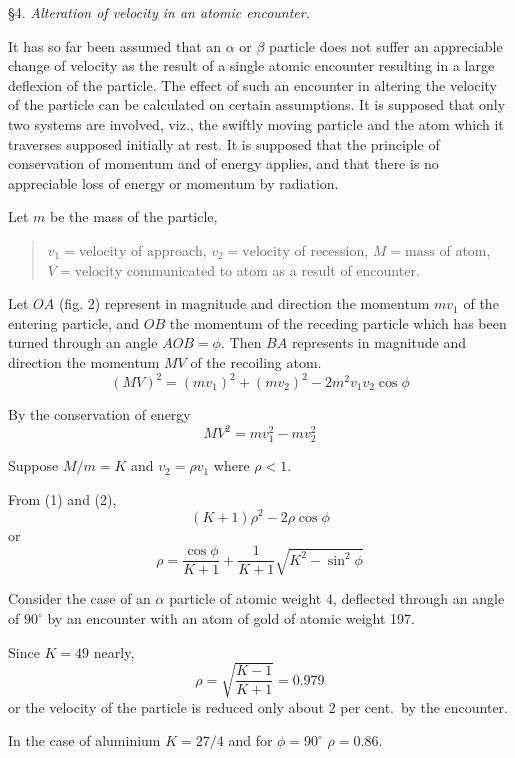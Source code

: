 \documentclass[12pt]{article}
\begin{document}
\bigskip
\S 4. {\it Alteration of velocity in an atomic encounter.}

\bigskip
It has so far been assumed that an $\alpha$ or $\beta$ particle does not suffer an appreciable change of velocity
as the result of a single atomic encounter resulting in a large deflexion of the particle.
The effect of such an encounter in altering the velocity of the particle can be calculated on certain assumptions.
It is supposed that only two systems are involved, viz., the swiftly moving particle and the atom which
it traverses supposed initially at rest.
It is supposed that the principle of conservation of momentum and of energy applies,
and that there is no appreciable loss of energy or momentum by radiation.

\bigskip
Let $m$ be the mass of the particle,
\begin{quote}
$v_1=\text{velocity}$ of approach,\newline
$v_2=\text{velocity}$ of recession,\newline
$M=\text{mass}$ of atom,\newline
$V=\text{velocity}$ communicated to atom as a result of encounter.
\end{quote}

Let $OA$ (fig. 2) represent in magnitude and direction the momentum $mv_1$ of the entering particle,
and $OB$ the momentum of the receding particle which has been turned through an angle $AOB=\phi$.
Then $BA$ represents in magnitude and direction the momentum $MV$ of the recoiling atom.
\begin{equation*}
(MV)^2=(mv_1)^2+(mv_2)^2-2m^2v_1v_2\cos\phi
\tag{1}
\end{equation*}

By the conservation of energy
\begin{equation*}
MV^2=mv_1^2-mv_2^2
\tag{2}
\end{equation*}

Suppose $M/m=K$ and $v_2=\rho v_1$ where $\rho<1$.

\bigskip
From (1) and (2),
\begin{equation*}
(K+1)\rho^2-2\rho\cos\phi
\end{equation*}
or
\begin{equation*}
\rho=\frac{\cos\phi}{K+1}+\frac{1}{K+1}\sqrt{K^2-\sin^2\phi}
\end{equation*}

Consider the case of an $\alpha$ particle of atomic weight 4,
deflected through an angle of $90^\circ$ by an encounter with an atom of gold of atomic weight 197.

\bigskip
Since $K=49$ nearly,
\begin{equation*}
\rho=\sqrt{\frac{K-1}{K+1}}=0.979
\end{equation*}
or the velocity of the particle is reduced only about 2 per cent.~by the encounter.

\bigskip
In the case of aluminium $K=27/4$ and for $\phi=90^\circ$ $\rho=0.86$.
\end{document}
